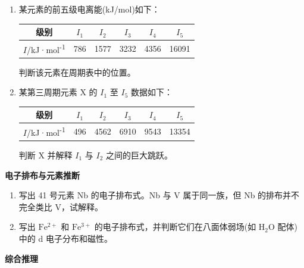 \documentclass[a4paper,11pt]{ctexart}
\newcounter{none}
\newcommand{\箭}{\ensuremath{\rightarrow}}
\newcommand{\左箭}{\ensuremath{\leftarrow}}
\newcommand{\上箭}{\ensuremath{\uparrow}}
\newcommand{\下箭}{\ensuremath{\downarrow}}
\newcommand{\衡}{\ensuremath{\rightleftharpoons}}
\newcommand{\双箭}{\ensuremath{\leftrightarrow}}
\newcommand{\约等于}{\ensuremath{\approx}}
\newcommand{\小于等于}{\ensuremath{\leq}}
\newcommand{\大于等于}{\ensuremath{\geq}}
\newcommand{\不等于}{\ensuremath{\neq}}
\newcommand{\西格马}{\ensuremath{\sigma}}
\newcommand{\派}{\ensuremath{\pi}}
\begin{document}
\begin{enumerate}
\def\labelenumi{\arabic{enumi}.}
\setcounter{enumi}{15}
\item
  某元素的前五级电离能(kJ/mol)如下：

  {\def\LTcaptype{none} %
  \begin{longtable}[]{@{}cccccc@{}}
  \toprule\noalign{}
  级别 & \(I_1\) & \(I_2\) & \(I_3\) & \(I_4\) & \(I_5\) \\
  \midrule\noalign{}
  \endhead
  \bottomrule\noalign{}
  \endlastfoot
  \(I\)/kJ·mol\textsuperscript{-1} & 786 & 1577 & 3232 & 4356 & 16091 \\
  \end{longtable}
  }

  判断该元素在周期表中的位置。
\item
  某第三周期元素 X 的 \(I_1\) 至 \(I_5\) 数据如下：

  {\def\LTcaptype{none} %
  \begin{longtable}[]{@{}cccccc@{}}
  \toprule\noalign{}
  级别 & \(I_1\) & \(I_2\) & \(I_3\) & \(I_4\) & \(I_5\) \\
  \midrule\noalign{}
  \endhead
  \bottomrule\noalign{}
  \endlastfoot
  \(I\)/kJ·mol\textsuperscript{-1} & 496 & 4562 & 6910 & 9543 & 13354 \\
  \end{longtable}
  }

  判断 X 并解释 \(I_1\) 与 \(I_2\) 之间的巨大跳跃。
\end{enumerate}

\textbf{电子排布与元素推断}

\begin{enumerate}
\def\labelenumi{\arabic{enumi}.}
\setcounter{enumi}{17}
\item
  写出 41 号元素 Nb 的电子排布式。Nb 与 V 属于同一族，但 Nb 的排布并不完全类比 V，试解释。
\item
  写出 \(\mathrm{Fe^{2+}}\) 和 \(\mathrm{Fe^{3+}}\) 的电子排布式，并判断它们在八面体弱场(如 \(\mathrm{H_2O}\) 配体)中的 d 电子分布和磁性。
\end{enumerate}

\textbf{综合推理}
\end{document}

